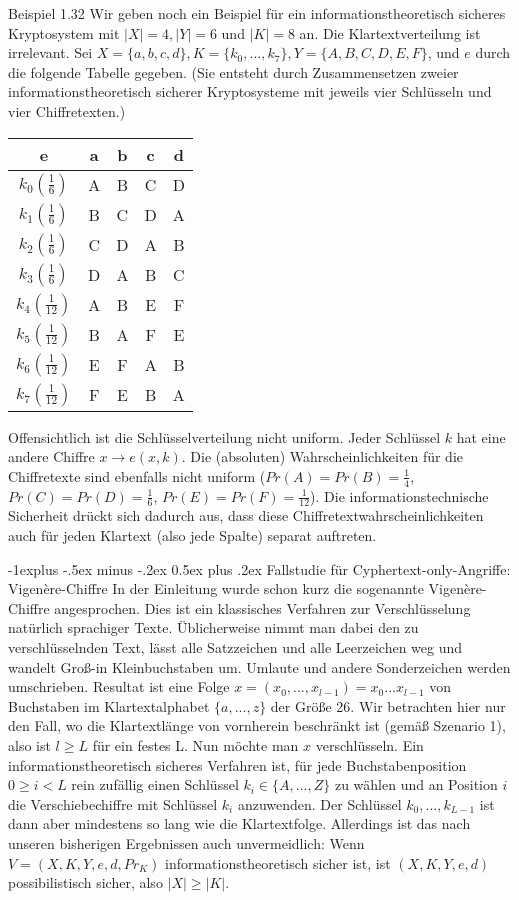 \documentclass[a4paper]{article}
\makeatletter
\renewcommand{\subsection}{\@startsection{subsection}{2}{0mm}%
 {-1explus -.5ex minus -.2ex}%
 {0.5ex plus .2ex}%
 {\normalfont\normalsize\bfseries}}
\makeatother
\begin{document}
\begin{multicols}{3}
    Beispiel 1.32 Wir geben noch ein Beispiel für ein informationstheoretisch sicheres Kryptosystem mit $|X|=4,|Y|=6$ und $|K|=8$ an. Die Klartextverteilung ist irrelevant. Sei $X=\{a,b,c,d\},K=\{k_0,...,k_7\},Y=\{A,B,C,D,E,F\}$, und $e$ durch die folgende Tabelle gegeben. (Sie entsteht durch Zusammensetzen zweier informationstheoretisch sicherer Kryptosysteme mit jeweils vier Schlüsseln und vier Chiffretexten.)
    \begin{tabular}{c|c|c|c|c}
     e          & a  & b  & c  & d  \\\hline
    $k_0 (\frac{1}{6})$ & A  & B  & C  & D  \\
     $k_1 (\frac{1}{6})$ & B  & C  & D  & A  \\
     $k_2 (\frac{1}{6})$ & C  & D  & A  & B  \\
     $k_3 (\frac{1}{6})$ & D  & A  & B  & C  \\
     $k_4 (\frac{1}{12})$ & A  & B  & E  & F  \\
     $k_5 (\frac{1}{12})$ & B  & A  & F  & E  \\
     $k_6 (\frac{1}{12})$ & E  & F  & A  & B  \\
     $k_7 (\frac{1}{12})$ & F  & E  & B  & A  
    \end{tabular}

    Offensichtlich ist die Schlüsselverteilung nicht uniform. Jeder Schlüssel $k$ hat eine andere Chiffre $x\rightarrow e(x,k)$. Die (absoluten) Wahrscheinlichkeiten für die Chiffretexte sind ebenfalls nicht uniform ($Pr(A)=Pr(B)=\frac{1}{4}$, $Pr(C)=Pr(D)=\frac{1}{6}$, $Pr(E)=Pr(F)=\frac{1}{12}$).
    Die informationstechnische Sicherheit drückt sich dadurch aus, dass diese Chiffretextwahrscheinlichkeiten auch für jeden Klartext (also jede Spalte) separat auftreten.

    \subsection{Fallstudie für Cyphertext-only-Angriffe: Vigenère-Chiffre}
    In der Einleitung wurde schon kurz die sogenannte Vigenère-Chiffre angesprochen. Dies ist ein klassisches Verfahren zur Verschlüsselung natürlich sprachiger Texte. Üblicherweise nimmt man dabei den zu verschlüsselnden Text, lässt alle Satzzeichen und alle Leerzeichen weg und wandelt Groß-in Kleinbuchstaben um. Umlaute und andere Sonderzeichen werden umschrieben. Resultat ist eine Folge $x=(x_0,...,x_{l-1})=x_0 ...x_{l-1}$ von Buchstaben im Klartextalphabet $\{a,...,z\}$ der Größe 26. Wir betrachten hier nur den Fall, wo die Klartextlänge von vornherein beschränkt ist (gemäß Szenario 1), also ist $l\geq L$ für ein festes L. Nun möchte man $x$ verschlüsseln. Ein informationstheoretisch sicheres Verfahren ist, für jede Buchstabenposition $0\geq i < L$ rein zufällig einen Schlüssel $k_i\in\{A,...,Z\}$ zu wählen und an Position $i$ die Verschiebechiffre mit Schlüssel $k_i$ anzuwenden. Der Schlüssel $k_0,...,k_{L-1}$ ist dann aber mindestens so lang wie die Klartextfolge. Allerdings ist das nach unseren bisherigen Ergebnissen auch unvermeidlich: Wenn $V=(X,K,Y,e,d,Pr_K)$ informationstheoretisch sicher ist, ist $(X,K,Y,e,d)$ possibilistisch sicher, also $|X|\geq |K|$.


\end{multicols}
\end{document}

